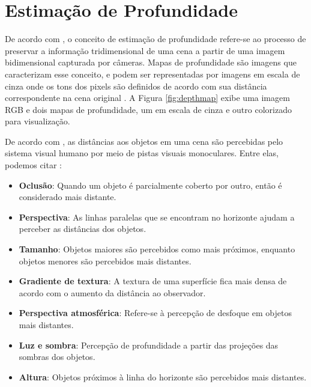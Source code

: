 \section{Estimação de Profundidade}


De acordo com , o conceito de estimação de profundidade refere-se ao processo de preservar a informação tridimensional de uma cena a partir de uma imagem bidimensional capturada por câmeras. Mapas de profundidade são imagens que caracterizam esse conceito, e podem ser representadas por imagens em escala de cinza onde os tons dos pixels são definidos de acordo com sua distância correspondente na cena original \cite{dourado2020multi}. A Figura \ref{fig:depthmap} exibe uma imagem RGB e dois mapas de profundidade, um em escala de cinza e outro colorizado para visualização.


De acordo com , as distâncias aos objetos em uma cena são percebidas pelo sistema visual humano por meio de pistas visuais monoculares. Entre elas, podemos citar :

\begin{itemize}
    \item \textbf{Oclusão}: Quando um objeto é parcialmente coberto por outro, então é considerado mais distante.
    \item \textbf{Perspectiva}: As linhas paralelas que se encontram no horizonte ajudam a perceber as distâncias dos objetos.
    \item \textbf{Tamanho}: Objetos maiores são percebidos como mais próximos, enquanto objetos menores são percebidos mais distantes.
    \item \textbf{Gradiente de textura}: A textura de uma superfície fica mais densa de acordo com o aumento da distância ao observador.
    \item \textbf{Perspectiva atmosférica}: Refere-se à percepção de desfoque em objetos mais distantes.
    \item \textbf{Luz e sombra}: Percepção de profundidade a partir das projeções das sombras dos objetos.
    \item \textbf{Altura}: Objetos próximos à linha do horizonte são percebidos mais distantes.
\end{itemize}






